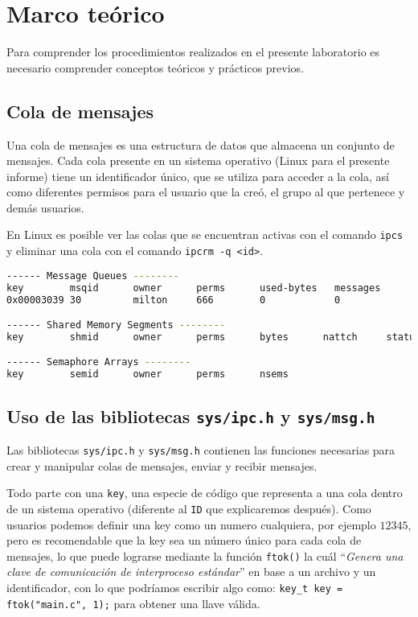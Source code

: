 \section{Marco teórico}\label{sec:MarcoTeorico}
Para comprender los procedimientos realizados en el presente laboratorio es necesario comprender conceptos teóricos y prácticos previos.
\subsection{Cola de mensajes}
Una cola de mensajes es una estructura de datos que almacena un conjunto de mensajes. Cada cola presente en un sistema operativo (Linux para el presente informe) tiene un identificador único, que se utiliza para acceder a la cola, así como diferentes permisos para el usuario que la creó, el grupo al que pertenece y demás usuarios.

En Linux es posible ver las colas que se encuentran activas con el comando \texttt{ipcs} y eliminar una cola con el comando \texttt{ipcrm -q <id>}.
\begin{lstlisting}[language=bash, style=CodeStyle, caption=colas de mensajes, label=lst:colas]
------ Message Queues --------
key        msqid      owner      perms      used-bytes   messages
0x00003039 30         milton     666        0            0

------ Shared Memory Segments --------
key        shmid      owner      perms      bytes      nattch     status

------ Semaphore Arrays --------
key        semid      owner      perms      nsems
\end{lstlisting}

\subsection{Uso de las bibliotecas \texttt{sys/ipc.h} y \texttt{sys/msg.h}}
Las bibliotecas \texttt{sys/ipc.h} y \texttt{sys/msg.h} contienen las funciones necesarias para crear y manipular colas de mensajes, enviar y recibir mensajes.

Todo parte con una \texttt{key}, una especie de código que representa a una cola dentro de un sistema operativo (diferente al \texttt{ID} que explicaremos después). Como usuarios podemos definir una key como un numero cualquiera, por ejemplo $12345$, pero es recomendable que la key sea un número único para cada cola de mensajes, lo que puede lograrse mediante la función \texttt{ftok()} la cuál ``\textit{Genera una clave de comunicación de interproceso estándar}''\parencite{ftok} en base a un archivo y un identificador, con lo que podríamos escribir algo como: \texttt{key\_t  key = ftok("main.c", 1);} para obtener una llave válida.


